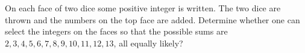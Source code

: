 On each face of two dice some positive integer is written. The two dice are thrown and the numbers on the top face are added. Determine whether one can select the integers on the faces so that the possible sums are $2,3,4,5,6,7,8,9,10,11,12,13$,  all equally likely?